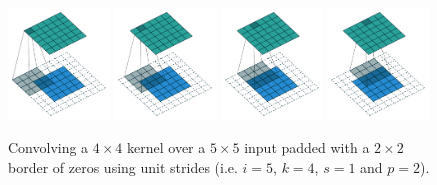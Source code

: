 \documentclass{report}
\begin{document}
\begin{figure}[p]
    \centering
    \includegraphics[width=0.24\textwidth]{pdf/arbitrary_padding_no_strides_00.pdf}
    \includegraphics[width=0.24\textwidth]{pdf/arbitrary_padding_no_strides_01.pdf}
    \includegraphics[width=0.24\textwidth]{pdf/arbitrary_padding_no_strides_02.pdf}
    \includegraphics[width=0.24\textwidth]{pdf/arbitrary_padding_no_strides_03.pdf}
    \caption{\label{fig:arbitrary_padding_no_strides} Convolving a $4 \times 4$
        kernel over a $5 \times 5$ input padded with a $2 \times 2$ border of
        zeros using unit strides (i.e. $i = 5$, $k = 4$, $s = 1$ and $p = 2$).}
\end{figure}
\end{document}
